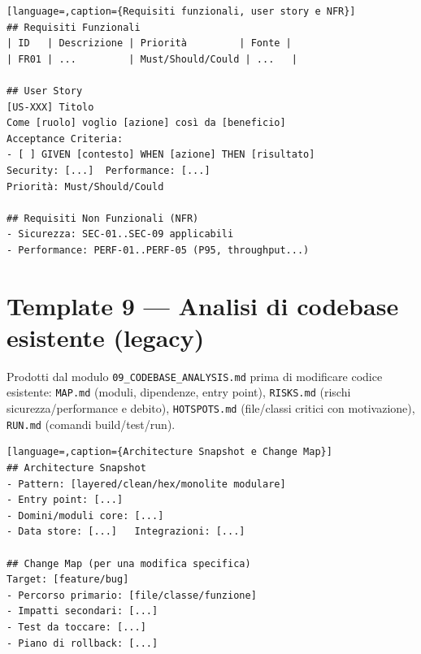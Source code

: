 \begin{lstlisting}[language=,caption={Requisiti funzionali, user story e NFR}]
## Requisiti Funzionali
| ID   | Descrizione | Priorità         | Fonte |
| FR01 | ...         | Must/Should/Could | ...   |

## User Story
[US-XXX] Titolo
Come [ruolo] voglio [azione] così da [beneficio]
Acceptance Criteria:
- [ ] GIVEN [contesto] WHEN [azione] THEN [risultato]
Security: [...]  Performance: [...]
Priorità: Must/Should/Could

## Requisiti Non Funzionali (NFR)
- Sicurezza: SEC-01..SEC-09 applicabili
- Performance: PERF-01..PERF-05 (P95, throughput...)
\end{lstlisting}

\section*{Template 9 --- Analisi di codebase esistente (legacy)}

Prodotti dal modulo \texttt{09\_CODEBASE\_ANALYSIS.md} prima di modificare codice esistente: \texttt{MAP.md} (moduli, dipendenze, entry point), \texttt{RISKS.md} (rischi sicurezza/performance e debito), \texttt{HOTSPOTS.md} (file/classi critici con motivazione), \texttt{RUN.md} (comandi build/test/run).

\begin{lstlisting}[language=,caption={Architecture Snapshot e Change Map}]
## Architecture Snapshot
- Pattern: [layered/clean/hex/monolite modulare]
- Entry point: [...]
- Domini/moduli core: [...]
- Data store: [...]   Integrazioni: [...]

## Change Map (per una modifica specifica)
Target: [feature/bug]
- Percorso primario: [file/classe/funzione]
- Impatti secondari: [...]
- Test da toccare: [...]
- Piano di rollback: [...]
\end{lstlisting}
